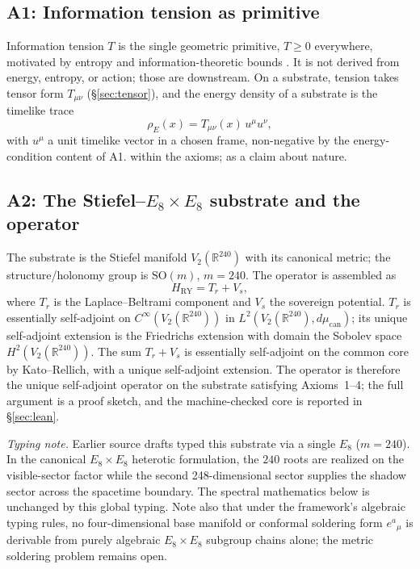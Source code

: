 \documentclass{alienfolio}
\begin{document}
\subsection{A1: Information tension as primitive}

Information tension $T$ is the single geometric primitive, $T \ge 0$
everywhere, motivated by entropy and information-theoretic bounds
\cite{shannon48,cover06,bekenstein73}. It is not derived from energy,
entropy, or action; those are downstream. On a substrate, tension takes
tensor form $T_{\mu\nu}$ (\S\ref{sec:tensor}), and the energy density of
a substrate is the timelike trace
\begin{equation}
\rho_{E}(x) = T_{\mu\nu}(x)\, u^{\mu} u^{\nu},
\label{eq:rhoE}
\end{equation}
with $u^{\mu}$ a unit timelike vector in a chosen frame, non-negative
by the energy-condition content of A1.  within the
axioms;  as a claim about nature.

\subsection{A2: The Stiefel--$E_{8} \times E_{8}$ substrate and the operator}

The substrate is the Stiefel manifold $V_{2}(\mathbb{R}^{240})$ with
its canonical metric; the structure/holonomy group is
$\mathrm{SO}(m)$, $m = 240$. The operator is assembled as
\begin{equation}
H_{\mathrm{RY}} = T_{r} + V_{s},
\label{eq:HRY}
\end{equation}
where $T_{r}$ is the Laplace--Beltrami component and $V_{s}$ the
sovereign potential. $T_{r}$ is essentially self-adjoint on
$C^{\infty}(V_{2}(\mathbb{R}^{240}))$ in
$L^{2}(V_{2}(\mathbb{R}^{240}), d\mu_{\mathrm{can}})$; its unique
self-adjoint extension is the Friedrichs extension with domain the
Sobolev space $H^{2}(V_{2}(\mathbb{R}^{240}))$. The sum $T_{r} + V_{s}$
is essentially self-adjoint on the common core by Kato--Rellich, with
a unique self-adjoint extension. The operator is therefore the unique
self-adjoint operator on the substrate satisfying Axioms~1--4; the full
argument is a proof sketch, and the machine-checked core is reported
in \S\ref{sec:lean}.

\emph{Typing note.} Earlier source drafts typed this substrate via a
single $E_{8}$ ($m = 240$). In the canonical $E_{8} \times E_{8}$
heterotic formulation, the $240$ roots are realized on the
visible-sector factor while the second 248-dimensional sector supplies the
shadow sector across the spacetime boundary. The spectral mathematics
below is unchanged by this global typing. Note also that under the
framework's algebraic typing rules, no four-dimensional base manifold
or conformal soldering form $e^{a}{}_{\mu}$ is derivable from purely
algebraic $E_{8} \times E_{8}$ subgroup chains alone; the metric
soldering problem remains open.
\end{document}
